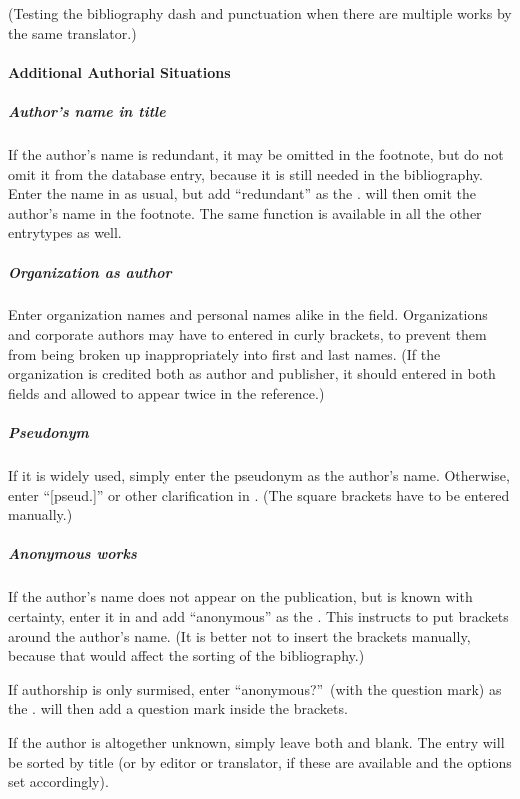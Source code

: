 \documentclass{ltxdockit}[2010/02/12]
\begin{document}
(Testing the bibliography dash and punctuation when there are multiple works by the same translator.\autocites[][]{silverstein:1974a})

\paragraph{Additional Authorial Situations}
\subparagraph{Author's name in title}
If the author's name is redundant, it may be omitted in the footnote, but do not omit it from the database entry, because it is still needed in the bibliography. Enter the name in  as usual, but add  ``redundant'' as the .\autocites{darwin1958the-autobio-redun}  will then omit the author's name in the footnote.
The same function is available in all the other entrytypes as well.\autocites[][]{2452}

\subparagraph{Organization as author}
Enter organization names and personal names alike in the  field.\autocites[][]{2748} Organizations and corporate authors may have to entered in curly brackets, to prevent them from being broken up inappropriately into first and last names.  (If the organization is credited both as author and publisher, it should entered in both fields and allowed to appear twice in the reference.)

\subparagraph{Pseudonym}
 If it is widely used, simply enter the pseudonym as the author's name. Otherwise, enter ``[pseud.]'' or other clarification in  .\autocites[][]{stumpke:1981} (The square brackets have to be entered manually.)

\subparagraph{Anonymous works}
If the author's name does not appear on the publication, but is known with certainty,  enter it in  and add \enquote{anonymous} as the  . This instructs  to put brackets around the author's name.\autocites[][]{385b} (It is better not to insert the brackets manually, because that would affect the sorting of the bibliography.)

If authorship is only surmised, enter \enquote{anonymous?}\midsentence\ (with the question mark) as the .  will then add a question mark inside the brackets.\autocites[][]{steiner:1981}

If the author is altogether unknown, simply leave both  and  blank.\autocites[][]{2201} The entry will be sorted by title (or by editor or translator, if these are available and the options set accordingly).
\end{document}
